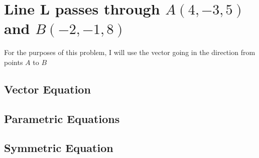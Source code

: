 \documentclass{article}
\begin{document}
\section{Line L passes through $A(4, -3, 5)$ and $B(-2, -1, 8)$}
For the purposes of this problem, I will use the vector going in the direction from points $A$ to $B$
\\
\subsection*{Vector Equation}
\subsection*{Parametric Equations}
\subsection*{Symmetric Equation}
\end{document}
